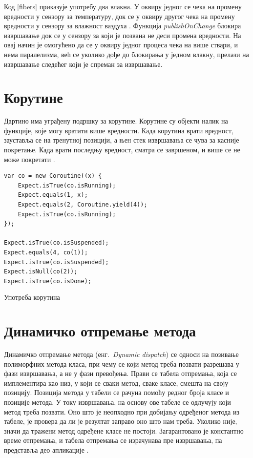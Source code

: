 \documentclass[12pt,oneside]{memoir}
\begin{document}
Код \ref{fibers} приказује употребу два влакна. У оквиру једног се чека на промену вредности у сензору за температуру, док се у оквиру другог чека на промену вредности у сензору за влажност ваздуха \cite{Dartino}. Функција \textit{publishOnChange} блокира извршавање док се у сензору за који је позвана не деси промена вредности. На овај начин је омогућено да се у оквиру једног процеса чека на више ствари, и нема паралелизма, већ се уколико дође до блокирања у једном влакну, прелази на извршавање следећег који је спреман за извршавање.

\section{Корутине}

Дартино има уграђену подршку за корутине. Корутине су објекти налик на функције, које могу вратити више вредности. Када корутина врати вредност, зауставља се на тренутној позицији, а њен стек извршавања се чува за касније покретање. Када врати последњу вредност, сматра се завршеном, и више се не може покретати  \cite{korutine_i_vlakna}.

\begin{listing}
\begin{verbatim}
var co = new Coroutine((x) {
    Expect.isTrue(co.isRunning);
    Expect.equals(1, x);
    Expect.equals(2, Coroutine.yield(4));
    Expect.isTrue(co.isRunning);
});

Expect.isTrue(co.isSuspended);
Expect.equals(4, co(1));
Expect.isTrue(co.isSuspended);
Expect.isNull(co(2));
Expect.isTrue(co.isDone);
\end{verbatim}
\caption{Употреба корутина}
\label{coroutines}
\end{listing}

\section{Динамичко отпремање метода}

Динамичко отпремање метода (енг.~\textit{Dynamic dispatch}) се односи на позивање полиморфних метода класа, при чему се који метод треба позвати разрешава у фази извршавања, а не у фази превођења. Прави се табела отпремања, која се имплементира као низ, у који се сваки метод, сваке класе, смешта на своју позицију. Позиција метода у табели се рачуна помоћу редног броја класе и позиције метода. У току извршавања, на основу ове табеле се одлучују који метод треба позвати. Оно што је неопходно при добијању одређеног метода из табеле, је провера да ли је резултат заправо оно што нам треба. Уколико није, значи да тражени метод одређене класе не постоји. Загарантовано је константно време отпремања, и табела отпремања се израчунава пре извршавања, па представља део апликације \cite{Dartino}.
\end{document}
